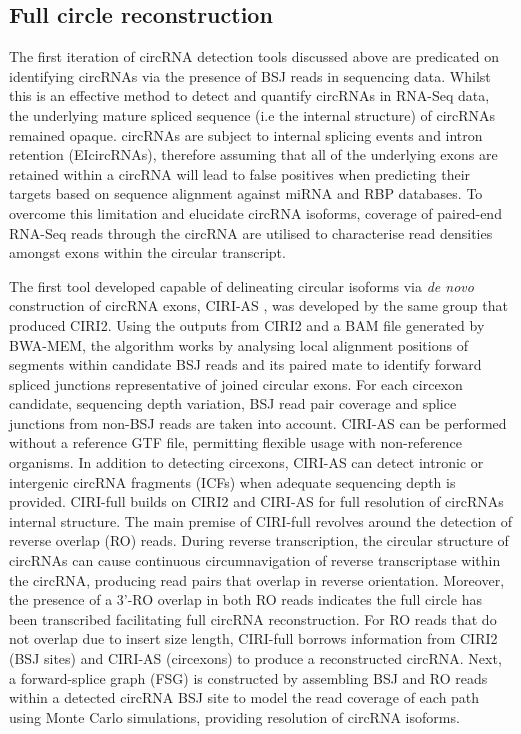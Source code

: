 \documentclass[pdflatex,sn-mathphys-num]{sn-jnl}
\begin{document}
\subsection{Full circle reconstruction} \label{Full circle reconstruction}
The first iteration of circRNA detection tools discussed above are predicated on identifying circRNAs via the presence of BSJ reads in sequencing data. Whilst this is an effective method to detect and quantify circRNAs in RNA-Seq data, the underlying mature spliced sequence (i.e the internal structure) of circRNAs remained opaque. circRNAs are subject to internal splicing events and intron retention (EIcircRNAs), therefore assuming that all of the underlying exons are retained within a circRNA will lead to false positives when predicting their targets based on sequence alignment against miRNA and RBP databases. To overcome this limitation and elucidate circRNA isoforms, coverage of paired-end RNA-Seq reads through the circRNA are utilised to characterise read densities amongst exons within the circular transcript. \par
The first tool developed capable of delineating circular isoforms via \textit{de novo} construction of circRNA exons, CIRI-AS \cite{CIRI-AS}, was developed by the same group that produced CIRI2. Using the outputs from CIRI2 and a BAM file generated by BWA-MEM, the algorithm works by analysing local alignment positions of segments within candidate BSJ reads and its paired mate to identify forward spliced junctions representative of joined circular exons. For each circexon candidate, sequencing depth variation, BSJ read pair coverage and splice junctions from non-BSJ reads are taken into account. CIRI-AS can be performed without a reference GTF file, permitting flexible usage with non-reference organisms. In addition to detecting circexons, CIRI-AS can detect intronic or intergenic circRNA fragments (ICFs) when adequate sequencing depth is provided. CIRI-full \cite{CIRI-full} builds on CIRI2 and CIRI-AS for full resolution of circRNAs internal structure. The main premise of CIRI-full revolves around the detection of reverse overlap (RO) reads. During reverse transcription, the circular structure of circRNAs can cause continuous circumnavigation of reverse transcriptase within the circRNA, producing read pairs that overlap in reverse orientation. Moreover, the presence of a 3'-RO overlap in both RO reads indicates the full circle has been transcribed facilitating full circRNA reconstruction. For RO reads that do not overlap due to insert size length, CIRI-full borrows information from CIRI2 (BSJ sites) and CIRI-AS (circexons) to produce a reconstructed circRNA. Next, a forward-splice graph (FSG) is constructed by assembling BSJ and RO reads within a detected circRNA BSJ site to model the read coverage of each path using Monte Carlo simulations, providing resolution of circRNA isoforms. \par
\end{document}
